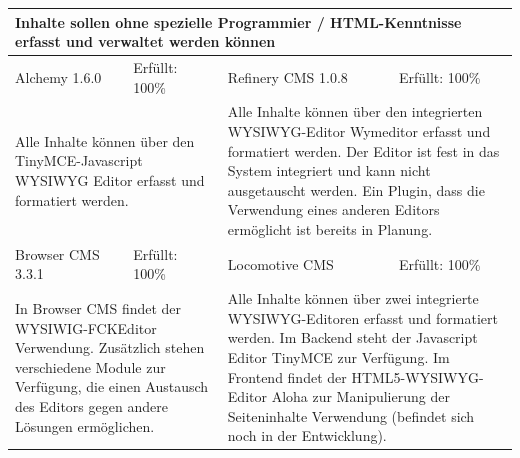 \begin{tabular}[!ht]{|l|l|l|l|}
\hline
\multicolumn{4}{|p{15cm}|}{\textbf{Inhalte sollen ohne spezielle Programmier / HTML-Kenntnisse erfasst und verwaltet werden können}} \\
\hline
  Alchemy 1.6.0 & \cellcolor{green}Erfüllt: 100\% & Refinery CMS 1.0.8 & \cellcolor{green}Erfüllt: 100\% \\
  \hline
  \multicolumn{2}{|p{7.5cm}|}{Alle Inhalte können über den TinyMCE-Javascript WYSIWYG Editor erfasst und formatiert werden.}
   & \multicolumn{2}{p{7.5cm}|}{Alle Inhalte können über den integrierten WYSIWYG-Editor Wymeditor erfasst und formatiert werden. Der Editor ist fest in das System integriert und kann nicht ausgetauscht werden. Ein Plugin, dass die Verwendung eines anderen Editors ermöglicht ist bereits in Planung.} \\
  \hline
  Browser CMS 3.3.1 & \cellcolor{green}Erfüllt: 100\% & Locomotive CMS & \cellcolor{green}Erfüllt: 100\% \\
  \hline
  \multicolumn{2}{|p{7.5cm}|}{In Browser CMS findet der WYSIWIG-FCKEditor Verwendung. Zusätzlich stehen verschiedene Module zur Verfügung, die einen Austausch des Editors gegen andere Lösungen ermöglichen.} & \multicolumn{2}{p{7.5cm}|}{Alle Inhalte können über zwei integrierte WYSIWYG-Editoren erfasst und formatiert werden. Im Backend steht der Javascript Editor TinyMCE zur Verfügung. Im Frontend findet der HTML5-WYSIWYG-Editor Aloha zur Manipulierung der Seiteninhalte Verwendung (befindet sich noch in der Entwicklung).} \\
\hline
\end{tabular}
\newline
\newline
\newline
